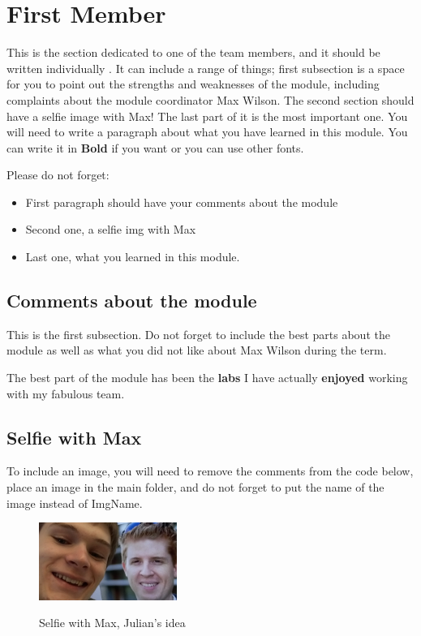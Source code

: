 
\section{First Member}
This is the section dedicated to one of the team members, and it should be written individually . It can include a range of things; first subsection is a space for you to point out the strengths and weaknesses of the module, including complaints about the module coordinator Max Wilson. The second section should have a selfie image with Max! The last part of it is the most important one. You will need to write a paragraph about what you have learned in this module. You can write it in \textbf{Bold} if you want or you can use other fonts. 

Please do not forget:
\begin{itemize}
	\item First paragraph should have your comments about the module
	\item Second one, a selfie img with Max
	\item Last one, what you learned in this module.
\end{itemize}

\subsection{Comments about the module}
This is the first subsection. Do not forget to include the best parts about the module as well as what you did not like about Max Wilson during the term.

The best part of the module has been the \textbf{labs} I have actually \textbf{enjoyed} working with my {fabulous} team. 

\subsection{Selfie with Max}

To include an image, you will need to remove the comments from the code below, place an image in the main folder, and do not forget to put the name of the image instead of ImgName. 


\begin{figure}[h]
\caption{Selfie with Max, Julian's idea}
\centering
\includegraphics[width=0.4\textwidth]{maxSelfieJoshua.jpg}
\label{fig:selfie}
\end{figure}

